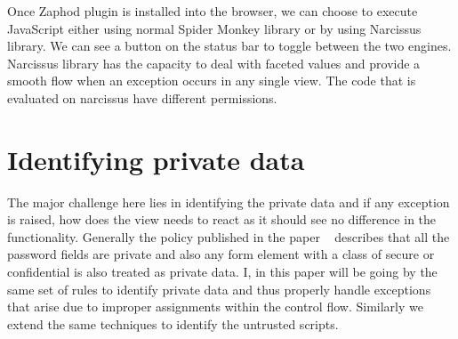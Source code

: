 Once Zaphod plugin is installed into the browser, we can choose to execute JavaScript either using normal Spider Monkey library or by using Narcissus library. We can see a button on the status bar to toggle between the two engines. Narcissus library has the capacity to deal with faceted values and provide a smooth flow when an exception occurs in any single view. The code that is evaluated on narcissus have different permissions. 

\section{Identifying private data} 
The major challenge here lies in identifying the private data and if any exception is raised, how does the view needs to react as it should see no difference in the functionality. Generally the policy published in the paper ~\cite{bib4} describes that all the password fields are private and also any form element with a class of secure or confidential is also treated as private data. I, in this paper will be going by the same set of rules to identify private data and thus properly handle exceptions that arise due to improper assignments within the control flow. Similarly we extend the same techniques to identify the untrusted scripts.

